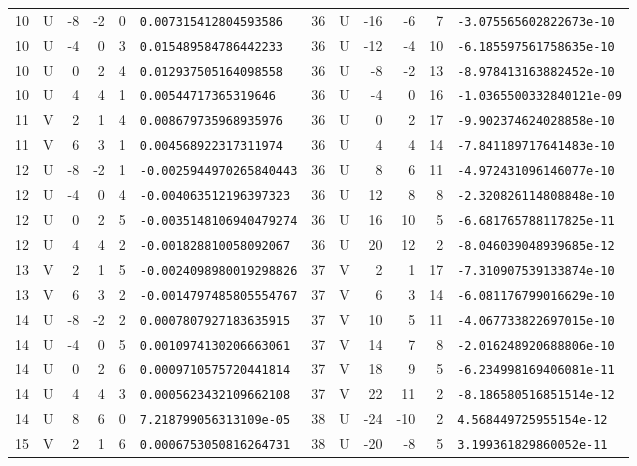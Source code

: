 \begin{longtable}{rcrrrl|rcrrrl}
10 & U & -8 & -2 & 0 & \texttt{0.007315412804593586} & 36 & U & -16 & -6 & 7 & \texttt{-3.075565602822673e-10}\\
10 & U & -4 & 0 & 3 & \texttt{0.015489584786442233} & 36 & U & -12 & -4 & 10 & \texttt{-6.185597561758635e-10}\\
10 & U & 0 & 2 & 4 & \texttt{0.012937505164098558} & 36 & U & -8 & -2 & 13 & \texttt{-8.978413163882452e-10}\\
10 & U & 4 & 4 & 1 & \texttt{0.00544717365319646} & 36 & U & -4 & 0 & 16 & \texttt{-1.0365500332840121e-09}\\
11 & V & 2 & 1 & 4 & \texttt{0.008679735968935976} & 36 & U & 0 & 2 & 17 & \texttt{-9.902374624028858e-10}\\
11 & V & 6 & 3 & 1 & \texttt{0.004568922317311974} & 36 & U & 4 & 4 & 14 & \texttt{-7.841189717641483e-10}\\
12 & U & -8 & -2 & 1 & \texttt{-0.0025944970265840443} & 36 & U & 8 & 6 & 11 & \texttt{-4.972431096146077e-10}\\
12 & U & -4 & 0 & 4 & \texttt{-0.004063512196397323} & 36 & U & 12 & 8 & 8 & \texttt{-2.320826114808848e-10}\\
12 & U & 0 & 2 & 5 & \texttt{-0.0035148106940479274} & 36 & U & 16 & 10 & 5 & \texttt{-6.681765788117825e-11}\\
12 & U & 4 & 4 & 2 & \texttt{-0.001828810058092067} & 36 & U & 20 & 12 & 2 & \texttt{-8.046039048939685e-12}\\
13 & V & 2 & 1 & 5 & \texttt{-0.0024098980019298826} & 37 & V & 2 & 1 & 17 & \texttt{-7.310907539133874e-10}\\
13 & V & 6 & 3 & 2 & \texttt{-0.0014797485805554767} & 37 & V & 6 & 3 & 14 & \texttt{-6.081176799016629e-10}\\
14 & U & -8 & -2 & 2 & \texttt{0.0007807927183635915} & 37 & V & 10 & 5 & 11 & \texttt{-4.067733822697015e-10}\\
14 & U & -4 & 0 & 5 & \texttt{0.0010974130206663061} & 37 & V & 14 & 7 & 8 & \texttt{-2.016248920688806e-10}\\
14 & U & 0 & 2 & 6 & \texttt{0.0009710575720441814} & 37 & V & 18 & 9 & 5 & \texttt{-6.234998169406081e-11}\\
14 & U & 4 & 4 & 3 & \texttt{0.0005623432109662108} & 37 & V & 22 & 11 & 2 & \texttt{-8.186580516851514e-12}\\
14 & U & 8 & 6 & 0 & \texttt{7.218799056313109e-05} & 38 & U & -24 & -10 & 2 & \texttt{4.568449725955154e-12}\\
15 & V & 2 & 1 & 6 & \texttt{0.0006753050816264731} & 38 & U & -20 & -8 & 5 & \texttt{3.199361829860052e-11}\\

\end{longtable}
